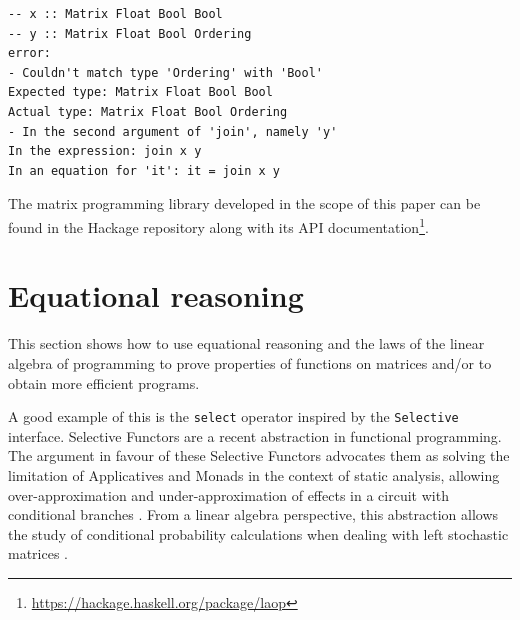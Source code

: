 \documentclass[sigplan]{acmart}\settopmatter{}
\newcommand{\hs}{\texttt}
\def\start{&&}
\def\just#1#2{\\ &#1& \rule{2em}{0pt} \{ \mbox{\rule[-.7em]{0pt}{1.8em} \small #2 \/} \} \nonumber\\ && }
\begin{document}
\begin{verbatim}
-- x :: Matrix Float Bool Bool
-- y :: Matrix Float Bool Ordering
error:
- Couldn't match type 'Ordering' with 'Bool'
Expected type: Matrix Float Bool Bool
Actual type: Matrix Float Bool Ordering
- In the second argument of 'join', namely 'y'
In the expression: join x y
In an equation for 'it': it = join x y
\end{verbatim}

The matrix programming library developed in the scope of this paper can be found in the Hackage repository along with its API documentation\footnote{
\url{https://hackage.haskell.org/package/laop}}.

\section{Equational reasoning}\label{sec-eq-reas}

This section shows how to use equational reasoning and the laws of the linear algebra of programming to prove properties of functions on matrices and/or to obtain more efficient programs.

A good example of this is the \hs{select} operator inspired by the \hs{Selective} interface. Selective Functors are a recent abstraction in functional programming. The argument in favour of these Selective Functors advocates them as solving the limitation of Applicatives and Monads in the context of static analysis, allowing over-approximation and under-approximation of effects in a circuit with conditional branches \cite{andrey2019selective}. From a linear algebra perspective, this abstraction allows the study of conditional probability calculations when dealing with left stochastic matrices \cite{Armando2020}. 
\end{document}
